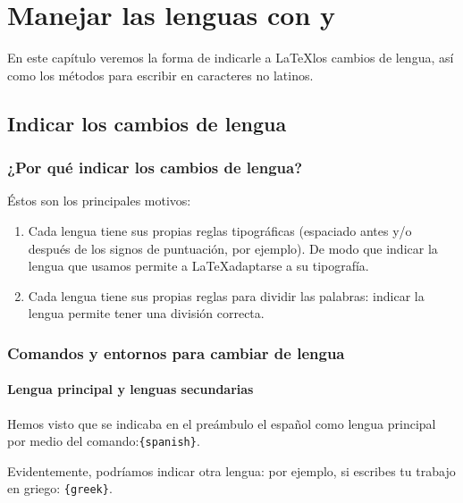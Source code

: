 \chapter{Manejar las lenguas con  y }\label{i18n}

\begin{intro}
    En este capítulo veremos la forma de indicarle a \LaTeX los cambios de lengua, así como los métodos para escribir en caracteres no latinos.
\end{intro}

\section{Indicar los cambios de lengua}

\subsection{¿Por qué indicar los cambios de lengua?}

Éstos son los principales motivos:
\begin{enumerate}
\item Cada lengua tiene sus propias reglas tipográficas (espaciado antes y/o después de los signos de puntuación, por ejemplo). De modo que indicar la lengua que usamos permite a \LaTeX adaptarse a su tipografía.
\item Cada lengua tiene sus propias reglas para dividir las palabras: indicar la lengua permite tener una división correcta.
\end{enumerate}


\subsection{Comandos y entornos para cambiar de lengua}

\subsubsection{Lengua principal y lenguas secundarias}

Hemos visto que se indicaba en el preámbulo el español como lengua principal por medio del comando:\verb|{spanish}|.



Evidentemente, podríamos indicar otra lengua: por ejemplo, si escribes tu trabajo en griego:
\verb|{greek}|.

